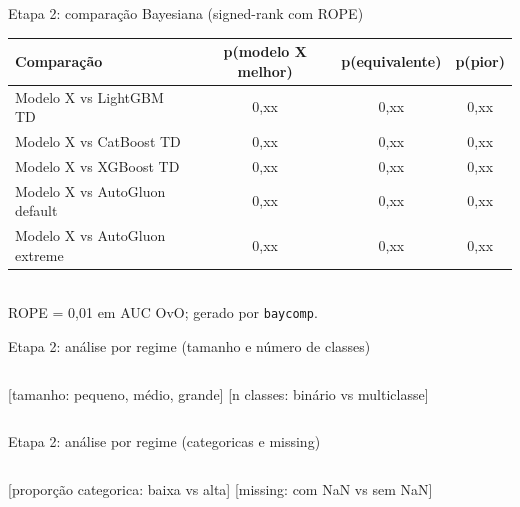 \documentclass[aspectratio=169,11pt]{beamer}
\begin{document}
\begin{frame}{Etapa 2: comparação Bayesiana (signed-rank com ROPE)}
    \footnotesize
    \begin{tabular}{l c c c}
        \toprule
        \textbf{Comparação} & \textbf{p(modelo X melhor)} & \textbf{p(equivalente)} & \textbf{p(pior)} \\
        \midrule
        Modelo X vs LightGBM TD       & 0,xx & 0,xx & 0,xx \\
        Modelo X vs CatBoost TD       & 0,xx & 0,xx & 0,xx \\
        Modelo X vs XGBoost TD        & 0,xx & 0,xx & 0,xx \\
        Modelo X vs AutoGluon default & 0,xx & 0,xx & 0,xx \\
        Modelo X vs AutoGluon extreme & 0,xx & 0,xx & 0,xx \\
        \bottomrule
    \end{tabular}
    \\[0.3em]
    ROPE = 0,01 em AUC OvO; gerado por \texttt{baycomp}.
\end{frame}

\begin{frame}{Etapa 2: análise por regime (tamanho e número de classes)}
    \begin{columns}[T,onlytextwidth]
        \centering
        [tamanho: pequeno, médio, grande]
        \centering
        [n classes: binário vs multiclasse]
    \end{columns}
\end{frame}

\begin{frame}{Etapa 2: análise por regime (categoricas e missing)}
    \begin{columns}[T,onlytextwidth]
        \centering
        [proporção categorica: baixa vs alta]
        \centering
        [missing: com NaN vs sem NaN]
    \end{columns}
\end{frame}
\end{document}
